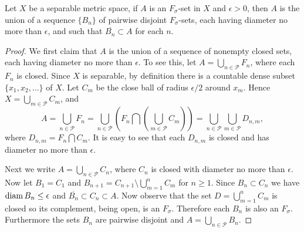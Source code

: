 \begin{lemma} \label{L:sep_fsigma}
Let $X$ be a separable metric space, if $A$ is an $F_{\sigma}$-set in $X$ and
$\epsilon>0$, then $A$ is the union of a sequence $\{B_n\}$ of pairwise disjoint
$F_{\sigma}$-sets, each having diameter no more than $\epsilon$, and such that
$\overline{B_n}\subset A$ for each $n$.
\end{lemma}
\begin{proof}
We first claim that $A$ is the union of a sequence of nonempty closed sets, each
having diameter no more than $\epsilon$. To see this, let 
$A=\bigcup_{n\in\mathcal{P}} F_n$, where each $F_n$ is closed. Since $X$ is
separable, by definition there is a countable dense subset 
$\{x_1,x_2,\dots\}$ of $X$. Let $C_m$ be the close ball of radius $\epsilon/2$
around $x_m$. Hence $X=\bigcup_{m\in\mathcal{P}} C_m$, and
\[
  A = \bigcup_{n\in\mathcal{P}} F_n
    = \bigcup_{n\in\mathcal{P}} ( F_n \bigcap (\bigcup_{m\in\mathcal{P}} C_m) )
    = \bigcup_{n\in\mathcal{P}} \bigcup_{m\in\mathcal{P}} D_{n,m},
\]
where $D_{n,m}=F_n\bigcap C_m$. It is easy to see that each $D_{n,m}$ is closed 
and has diameter no more than $\epsilon$.

Next we write $A=\bigcup_{n\in\mathcal{P}} C_n$, where $C_n$ is closed with
diameter no more than $\epsilon$. Now let $B_1=C_1$ and 
$B_{n+1}=C_{n+1}\setminus\bigcup_{m=1}^n C_m$ for $n\geq 1$. Since 
$B_n\subset C_n$ we have $\operatorname*{diam} B_n\leq\epsilon$ and 
$\overline{B_n}\subset C_n\subset A$. Now observe that the set 
$D=\bigcup_{m=1}^n C_m$ is closed so its complement, being open, is an
$F_{\sigma}$. Therefore each $B_n$ is also an $F_{\sigma}$. Furthermore the sets
$B_n$ are pairwise disjoint and $A=\bigcup_{n\in\mathcal{P}} B_n$.
\end{proof}

